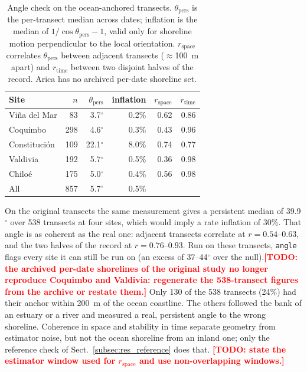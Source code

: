 \documentclass[authoryear,preprint,review,12pt]{elsarticle}
\newcommand{\todo}[1]{\textcolor{red}{\textbf{[TODO: #1]}}}
\begin{document}
\begin{table}[t]
  \centering
  \small
  \caption{Angle check on the ocean-anchored transects. $\theta_\mathrm{pers}$
  is the per-transect median across dates; inflation is the median of
  $1/\cos\theta_\mathrm{pers}-1$, valid only for shoreline motion
  perpendicular to the local orientation. $r_\mathrm{space}$ correlates
  $\theta_\mathrm{pers}$ between adjacent transects ($\approx$100~m apart) and
  $r_\mathrm{time}$ between two disjoint halves of the record. Arica has no
  archived per-date shoreline set.}
  \label{tab:angle}
  \begin{tabular}{@{}lrrrrr@{}}
    \toprule
    Site & $n$ & $\theta_\mathrm{pers}$ & inflation & $r_\mathrm{space}$ & $r_\mathrm{time}$ \\
    \midrule
    Vi\~na del Mar & 83  & 3.7$^\circ$  & 0.2\% & 0.62 & 0.86 \\
    Coquimbo       & 298 & 4.6$^\circ$  & 0.3\% & 0.43 & 0.96 \\
    Constituci\'on & 109 & 22.1$^\circ$ & 8.0\% & 0.74 & 0.77 \\
    Valdivia       & 192 & 5.7$^\circ$  & 0.5\% & 0.36 & 0.98 \\
    Chilo\'e       & 175 & 5.0$^\circ$  & 0.4\% & 0.56 & 0.98 \\
    \midrule
    All            & 857 & 5.7$^\circ$  & 0.5\% &      &      \\
    \bottomrule
  \end{tabular}
\end{table}

On the original transects the same measurement gives a persistent median of
39.9$^\circ$ over 538 transects at four sites, which would imply a rate
inflation of 30\%. That angle is as coherent as the real one: adjacent
transects correlate at $r=0.54$--$0.63$, and the two halves of the record at
$r=0.76$--$0.93$. Run on these transects, \texttt{angle} flags every site it can still be run on
(an excess of 37--44$^\circ$ over the null).\todo{the archived per-date
shorelines of the original study no longer reproduce Coquimbo and Valdivia:
regenerate the 538-transect figures from the archive or restate them.}
Only 130 of the 538 transects (24\%) had their anchor within
200~m of the ocean coastline. The others followed the bank of an estuary or a
river and measured a real, persistent angle to the wrong shoreline. Coherence
in space and stability in time separate geometry from estimator noise, but not
the ocean shoreline from an inland one; only the reference check of
Sect.~\ref{subsec:res_reference} does that.
\todo{state the estimator window used for $r_\mathrm{space}$ and use
non-overlapping windows.}
\end{document}
